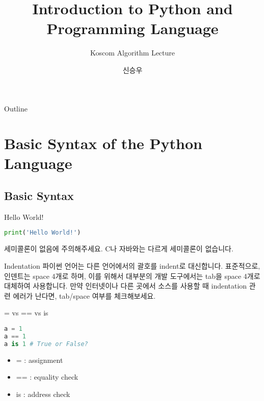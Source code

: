 \documentclass{beamer}
\title{Introduction to Python and Programming Language}
\subtitle{Koscom Algorithm Lecture}
\author{신승우}
\begin{document}
\begin{frame}
  \titlepage
\end{frame}

\begin{frame}{Outline}
  \tableofcontents
\end{frame}



\section{Basic Syntax of the Python Language} 

\subsection{Basic Syntax} 

\begin{frame}[fragile]{Hello World!}
\begin{lstlisting}[language=Python]
print('Hello World!')
\end{lstlisting}

세미콜론이 없음에 주의해주세요. C나 자바와는 다르게 세미콜론이 없습니다. 
\end{frame}

\begin{frame}{Indentation}
파이썬 언어는 다른 언어에서의 괄호를 indent로 대신합니다. 표준적으로, 인덴트는 space 4개로 하며, 이를 위해서 대부분의 개발 도구에서는 tab을 space 4개로 대체하여 사용합니다. 만약 인터넷이나 다른 곳에서 소스를 사용할 때 indentation 관련 에러가 난다면, tab/space 여부를 체크해보세요. 

\end{frame}

\begin{frame}[fragile]{= vs == vs is}
\begin{lstlisting}[language=Python]
a = 1
a == 1 
a is 1 # True or False?
\end{lstlisting}

\begin{itemize} 
\item = : assignment 
\item == : equality check
\item is : address check 
\end{itemize}
\end{frame}
\end{document}
